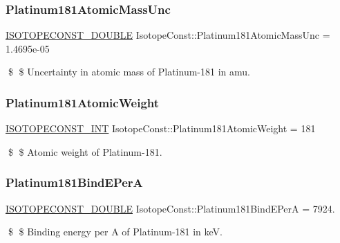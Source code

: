 \subsubsection{\texorpdfstring{Platinum181\+Atomic\+Mass\+Unc}{Platinum181AtomicMassUnc}}
{\footnotesize\ttfamily \mbox{\hyperlink{group___isotope_const-_macros_ga8f45a7272ce02c0b4c65c44636ed719a}{I\+S\+O\+T\+O\+P\+E\+C\+O\+N\+S\+T\+\_\+\+D\+O\+U\+B\+LE}} Isotope\+Const\+::\+Platinum181\+Atomic\+Mass\+Unc = 1.\+4695e-\/05}

\$ \$ Uncertainty in atomic mass of Platinum-\/181 in amu. \mbox{\label{group___isotope_const-_platinum-_pt181_gac4d3f3bfda5a55eff0d3d22bb19f1670}} 
\subsubsection{\texorpdfstring{Platinum181\+Atomic\+Weight}{Platinum181AtomicWeight}}
{\footnotesize\ttfamily \mbox{\hyperlink{group___isotope_const-_macros_ga5f18360b3e99483a35c32d789e62621c}{I\+S\+O\+T\+O\+P\+E\+C\+O\+N\+S\+T\+\_\+\+I\+NT}} Isotope\+Const\+::\+Platinum181\+Atomic\+Weight = 181}

\$ \$ Atomic weight of Platinum-\/181. \mbox{\label{group___isotope_const-_platinum-_pt181_ga9dc8816bb27e4807ad04dbfa8d62acaa}} 
\subsubsection{\texorpdfstring{Platinum181\+Bind\+E\+PerA}{Platinum181BindEPerA}}
{\footnotesize\ttfamily \mbox{\hyperlink{group___isotope_const-_macros_ga8f45a7272ce02c0b4c65c44636ed719a}{I\+S\+O\+T\+O\+P\+E\+C\+O\+N\+S\+T\+\_\+\+D\+O\+U\+B\+LE}} Isotope\+Const\+::\+Platinum181\+Bind\+E\+PerA = 7924.}

\$ \$ Binding energy per A of Platinum-\/181 in keV. \mbox{\label{group___isotope_const-_platinum-_pt181_ga73fd8ebf6a337ce0a6871525556bb45d}} 

